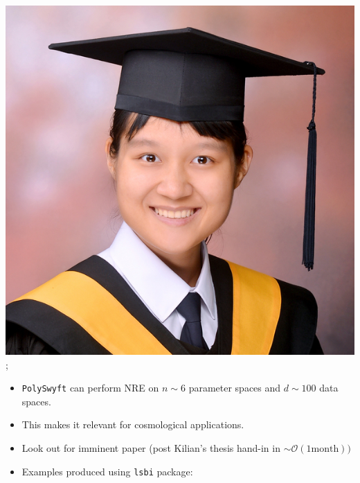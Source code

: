 \documentclass[aspectratio=169]{beamer}
\begin{document}
\begin{frame}
{        \includegraphics[width=0.09\textheight]{figures/students/wei-ning_deng.jpg}%
    };

    \begin{itemize}
        \item \texttt{PolySwyft} can perform NRE on $n\sim 6$ parameter spaces and $d\sim100$ data spaces.
        \item This makes it relevant for cosmological applications.
        \item Look out for imminent paper (post Kilian's thesis hand-in in $\sim\mathcal{O}(1 \text{month}))$
        \item Examples produced using \texttt{lsbi} package: \\
    \end{itemize}

\end{frame}
\end{document}
